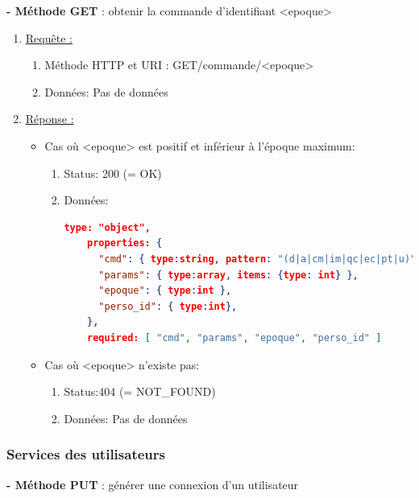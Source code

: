 \documentclass[11pt, a4paper]{article}
\begin{document}
  \newpage
  \textbf{- Méthode GET } : obtenir la commande d'identifiant <epoque>
  
  \begin{enumerate}
   \item \underline{Requête :}
    \begin{enumerate}
     \item Méthode HTTP et URI : GET/commande/<epoque>
     \item Données: Pas de données
	     
    \end{enumerate}

   \item \underline{Réponse :}
   \begin{itemize}
    \item Cas où <epoque> est positif et inférieur à l'époque maximum:
    \begin{enumerate}
     \item Status: 200 (= OK)
     \item Données:
	\begin{lstlisting}[language=JSON]
	type: "object",
	properties: {
	  "cmd": { type:string, pattern: "(d|a|cm|im|qc|ec|pt|u)" },
	  "params": { type:array, items: {type: int} },
	  "epoque": { type:int },
	  "perso_id": { type:int},
	},
	required: [ "cmd", "params", "epoque", "perso_id" ]
	\end{lstlisting} 
    \end{enumerate}

    \item Cas où <epoque> n'existe pas:
    \begin{enumerate}
     \item Status:404 (= NOT\_FOUND)
     \item Données: Pas de données
    \end{enumerate}
    
   \end{itemize}

  \end{enumerate}
  
  \subsubsection{Services des utilisateurs}
  \textbf{- Méthode PUT} : générer une connexion d'un utilisateur
  
\end{document}
